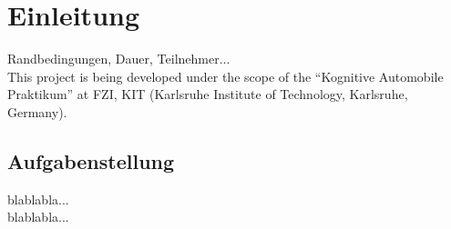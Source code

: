 
\chapter{Einleitung} %
\label{cha:Einleitung}
Randbedingungen, Dauer, Teilnehmer...\\

This project is being developed under the scope of the “Kognitive Automobile Praktikum” at FZI, KIT (Karlsruhe Institute of Technology, Karlsruhe, Germany).

\section{Aufgabenstellung} %
\label{sec:Aufgabenstellung}
blablabla...\\

blablabla... \citep{Asfour2006}

